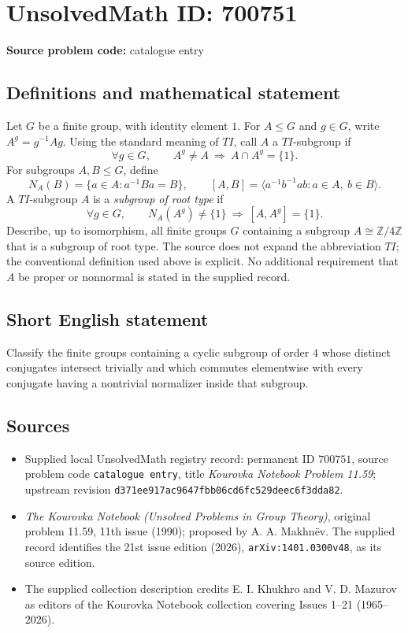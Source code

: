 \documentclass[11pt]{article}
\newcommand{\Z}{\mathbb{Z}}
\begin{document}
\section*{UnsolvedMath ID: 700751}
\textbf{Source problem code:} catalogue entry
\subsection{Definitions and mathematical statement}
Let \(G\) be a finite group, with identity element \(1\). For \(A\leq G\) and \(g\in G\), write \(A^g=g^{-1}Ag\). Using the standard meaning of \(TI\), call \(A\) a \(TI\)-subgroup if
\[
\forall g\in G,\qquad A^g\neq A\ \Longrightarrow\ A\cap A^g=\{1\}.
\]
For subgroups \(A,B\leq G\), define
\[
N_A(B)=\{a\in A:a^{-1}Ba=B\},\qquad
[A,B]=\langle a^{-1}b^{-1}ab:a\in A,\ b\in B\rangle.
\]
A \(TI\)-subgroup \(A\) is a \emph{subgroup of root type} if
\[
\forall g\in G,\qquad N_A(A^g)\neq\{1\}\ \Longrightarrow\ [A,A^g]=\{1\}.
\]
Describe, up to isomorphism, all finite groups \(G\) containing a subgroup \(A\cong\Z/4\Z\) that is a subgroup of root type. The source does not expand the abbreviation \(TI\); the conventional definition used above is explicit. No additional requirement that \(A\) be proper or nonnormal is stated in the supplied record.
\subsection{Short English statement}
Classify the finite groups containing a cyclic subgroup of order \(4\) whose distinct conjugates intersect trivially and which commutes elementwise with every conjugate having a nontrivial normalizer inside that subgroup.
\subsection{Sources}
\begin{itemize}
\item Supplied local UnsolvedMath registry record: permanent ID \(700751\), source problem code \texttt{catalogue entry}, title \emph{Kourovka Notebook Problem 11.59}; upstream revision \texttt{d371ee917ac9647fbb06cd6fc529deec6f3dda82}.
\item \emph{The Kourovka Notebook (Unsolved Problems in Group Theory)}, original problem 11.59, 11th issue (1990); proposed by A. A. Makhn\"ev. The supplied record identifies the 21st issue edition (2026), \texttt{arXiv:1401.0300v48}, as its source edition.
\item The supplied collection description credits E. I. Khukhro and V. D. Mazurov as editors of the Kourovka Notebook collection covering Issues 1--21 (1965--2026).
\end{itemize}
\end{document}
